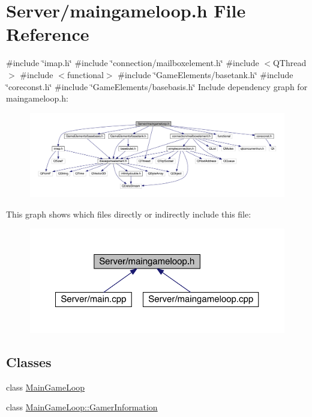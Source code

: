 \hypertarget{a00092}{}\section{Server/maingameloop.h File Reference}
\label{a00092}
{\ttfamily \#include \char`\"{}imap.\+h\char`\"{}}\newline
{\ttfamily \#include \char`\"{}connection/mailboxelement.\+h\char`\"{}}\newline
{\ttfamily \#include $<$Q\+Thread$>$}\newline
{\ttfamily \#include $<$functional$>$}\newline
{\ttfamily \#include \char`\"{}Game\+Elements/basetank.\+h\char`\"{}}\newline
{\ttfamily \#include \char`\"{}coreconst.\+h\char`\"{}}\newline
{\ttfamily \#include \char`\"{}Game\+Elements/basebasis.\+h\char`\"{}}\newline
Include dependency graph for maingameloop.\+h\+:
\nopagebreak
\begin{figure}[H]
\begin{center}
\leavevmode
\includegraphics[width=350pt]{d4/d7d/a00093}
\end{center}
\end{figure}
This graph shows which files directly or indirectly include this file\+:
\nopagebreak
\begin{figure}[H]
\begin{center}
\leavevmode
\includegraphics[width=350pt]{dc/d54/a00094}
\end{center}
\end{figure}
\subsection*{Classes}
\begin{DoxyCompactItemize}
\item 
class \hyperlink{a00209}{Main\+Game\+Loop}
\item 
class \hyperlink{a00213}{Main\+Game\+Loop\+::\+Gamer\+Information}
\end{DoxyCompactItemize}
